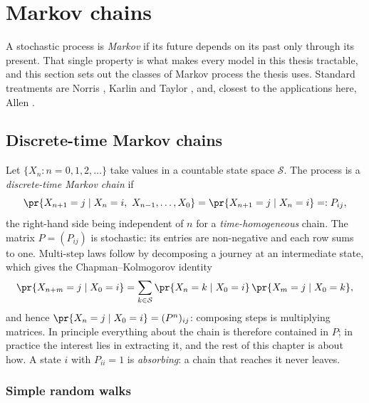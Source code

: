 \section{Markov chains}
\label{m:sec:chains}

A stochastic process is \emph{Markov} if its future depends on its past only
through its present. That single property is what makes every model in this thesis
tractable, and this section sets out the classes of Markov process the thesis uses.
Standard treatments are Norris \cite{Norris1997}, Karlin and Taylor
\cite{KarlinTaylor1975}, and, closest to the applications here, Allen
\cite{Allen2010}.

\subsection{Discrete-time Markov chains}
\label{m:sec:dtmc}

Let $\{X_n : n=0,1,2,\dots\}$ take values in a countable state space $\mathcal S$.
The process is a \emph{discrete-time Markov chain} if
\begin{equation}
\label{m:eq:dtmarkov}
\pr{X_{n+1}=j \mid X_n=i,\ X_{n-1},\dots,X_0} = \pr{X_{n+1}=j\mid X_n=i}
=: P_{ij},
\end{equation}
the right-hand side being independent of $n$ for a \emph{time-homogeneous} chain.
The matrix $P = (P_{ij})$ is stochastic: its entries are non-negative and each row
sums to one. Multi-step laws follow by decomposing a journey at an intermediate
state, which gives the Chapman--Kolmogorov identity
\begin{equation}
\label{m:eq:chapmankolmogorov}
\pr{X_{n+m}=j\mid X_0=i}
= \sum_{k\in\mathcal S}\pr{X_n=k\mid X_0=i}\,\pr{X_m=j\mid X_0=k},
\end{equation}
and hence $\pr{X_n=j\mid X_0=i}=(P^n)_{ij}$: composing steps is multiplying
matrices. In principle everything about the chain is therefore contained in $P$;
in practice the interest lies in extracting it, and the rest of this chapter is
about how. A state $i$ with $P_{ii}=1$ is \emph{absorbing}: a chain that reaches
it never leaves.

\subsubsection{Simple random walks}
\label{m:sec:randomwalk}

